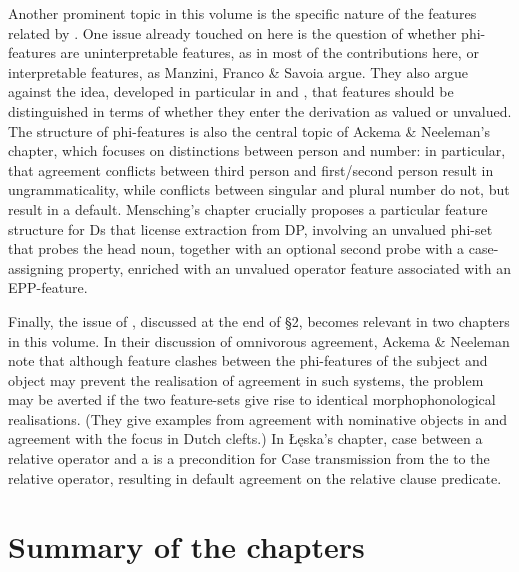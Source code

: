 \documentclass[output=paper]{langsci/langscibook}
\begin{document}
Another prominent topic in this volume is the specific nature of the features related by . One issue already touched on here is the question of whether phi-features are uninterpretable features, as in most of the contributions here, or interpretable features, as Manzini, Franco \& Savoia argue. They also argue against the idea, developed in particular in \citet{Chomsky2000} and \citet{Pesetsky2007}, that features should be distinguished in terms of whether they enter the derivation as valued or unvalued. The structure of phi-features is also the central topic of Ackema \& Neeleman’s chapter, which focuses on distinctions between person and number: in particular, that agreement conflicts between third person and first\slash second person result in ungrammaticality, while conflicts between singular and plural number do not, but result in a default. Mensching’s chapter crucially proposes a particular feature structure for Ds that license extraction from DP, involving an unvalued phi-set that probes the head noun, together with an optional second probe with a case-assigning property, enriched with an unvalued operator feature associated with an EPP-feature.

Finally, the issue of , discussed at the end of §2, becomes relevant in two chapters in this volume. In their discussion of omnivorous agreement, Ackema \& Neeleman note that although feature clashes between the phi-features of the subject and object may prevent the realisation of agreement in such systems, the problem may be averted if the two feature-sets give rise to identical morphophonological realisations. (They give examples from agreement with nominative objects in  and agreement with the focus in Dutch clefts.) In Łęska’s chapter, case  between a relative operator and a   is a precondition for Case transmission from the  to the relative operator, resulting in default agreement on the relative clause predicate.

\section{Summary of the chapters}
\end{document}
